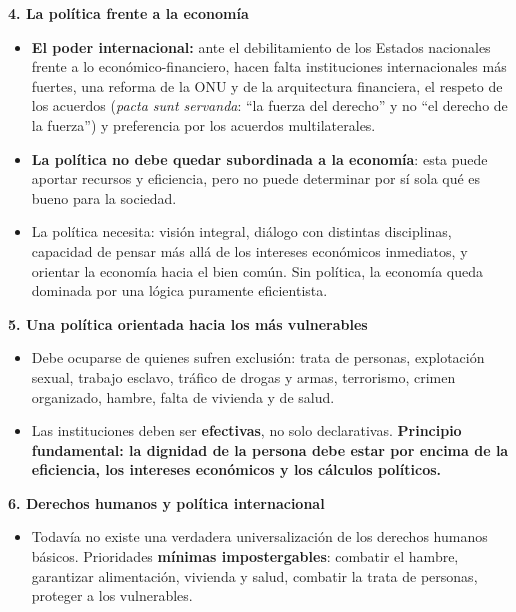\documentclass[10pt,a4paper]{article}
\begin{document}
\medskip\noindent \textbf{4. La política frente a la economía}\par\nopagebreak
\begin{itemize}
\item \textbf{El poder internacional:} ante el debilitamiento de los Estados nacionales frente a lo económico-financiero, hacen falta instituciones internacionales más fuertes, una reforma de la ONU y de la arquitectura financiera, el respeto de los acuerdos (\textit{pacta sunt servanda}: ``la fuerza del derecho'' y no ``el derecho de la fuerza'') y preferencia por los acuerdos multilaterales.
\item \textbf{La política no debe quedar subordinada a la economía}: esta puede aportar recursos y eficiencia, pero no puede determinar por sí sola qué es bueno para la sociedad.
\item La política necesita: visión integral, diálogo con distintas disciplinas, capacidad de pensar más allá de los intereses económicos inmediatos, y orientar la economía hacia el bien común. Sin política, la economía queda dominada por una lógica puramente eficientista.
\end{itemize}

\medskip\noindent \textbf{5. Una política orientada hacia los más vulnerables}\par\nopagebreak
\begin{itemize}
\item Debe ocuparse de quienes sufren exclusión: trata de personas, explotación sexual, trabajo esclavo, tráfico de drogas y armas, terrorismo, crimen organizado, hambre, falta de vivienda y de salud.
\item Las instituciones deben ser \textbf{efectivas}, no solo declarativas. \textbf{Principio fundamental: la dignidad de la persona debe estar por encima de la eficiencia, los intereses económicos y los cálculos políticos.}
\end{itemize}

\medskip\noindent \textbf{6. Derechos humanos y política internacional}\par\nopagebreak
\begin{itemize}
\item Todavía no existe una verdadera universalización de los derechos humanos básicos. Prioridades \textbf{mínimas impostergables}: combatir el hambre, garantizar alimentación, vivienda y salud, combatir la trata de personas, proteger a los vulnerables.
\end{itemize}
\end{document}
